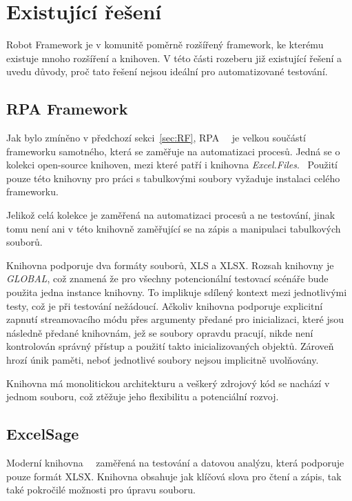 \section{Existující řešení}

Robot Framework je v komunitě poměrně rozšířený framework, ke kterému existuje mnoho rozšíření a knihoven. V této části rozeberu již existující řešení a uvedu důvody, proč tato řešení nejsou ideální pro automatizované testování.

\subsection{RPA Framework}

Jak bylo zmíněno v předchozí sekci~\ref{sec:RF}, RPA~\cite{RPADocs}~\cite{RPAGH} je velkou součástí frameworku samotného, která se zaměřuje na automatizaci procesů. Jedná se o kolekci open-source knihoven, mezi které patří i knihovna \textit{Excel.Files}.~\cite{RPAFiles} Použití pouze této knihovny pro práci s tabulkovými soubory vyžaduje instalaci celého frameworku.

Jelikož celá kolekce je zaměřená na  automatizaci procesů a ne testování, jinak tomu není ani v této knihovně zaměřující se na zápis a manipulaci tabulkových souborů. 

Knihovna podporuje dva formáty souborů, XLS a XLSX. Rozsah knihovny je \textit{GLOBAL}, což znamená že pro všechny potencionální testovací scénáře bude použita jedna instance knihovny. To implikuje sdílený kontext mezi jednotlivými testy, což je při testování nežádoucí. Ačkoliv knihovna podporuje explicitní zapnutí streamovacího módu přes argumenty předané pro inicializaci, které jsou následně předané knihovnám, jež se soubory opravdu pracují, nikde není kontrolován správný přístup a použití takto inicializovaných objektů. Zároveň hrozí únik paměti, neboť jednotlivé soubory nejsou implicitně uvolňovány. 

Knihovna má monolitickou architekturu a veškerý zdrojový kód se nachází v jednom souboru, což ztěžuje jeho flexibilitu a potenciální rozvoj.

\subsection{ExcelSage}

Moderní knihovna~\cite{ExcelSageGH}~\cite{ExcelSagePyPI} zaměřená na testování a datovou analýzu, která podporuje pouze formát XLSX. Knihovna obsahuje jak klíčová slova pro čtení a zápis, tak také pokročilé možnosti pro úpravu souboru.


